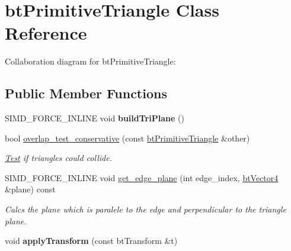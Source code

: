 \hypertarget{classbt_primitive_triangle}{\section{bt\+Primitive\+Triangle Class Reference}
\label{classbt_primitive_triangle}
}


Collaboration diagram for bt\+Primitive\+Triangle\+:
\subsection*{Public Member Functions}
\begin{DoxyCompactItemize}
\item 
\hypertarget{classbt_primitive_triangle_af744acb5a8197dd9154b9707fef252cc}{S\+I\+M\+D\+\_\+\+F\+O\+R\+C\+E\+\_\+\+I\+N\+L\+I\+N\+E void {\bfseries build\+Tri\+Plane} ()}\label{classbt_primitive_triangle_af744acb5a8197dd9154b9707fef252cc}

\item 
bool \hyperlink{classbt_primitive_triangle_a844b5c15a34e656e64135f43a8d27d53}{overlap\+\_\+test\+\_\+conservative} (const \hyperlink{classbt_primitive_triangle}{bt\+Primitive\+Triangle} \&other)
\begin{DoxyCompactList}\small\item\em \hyperlink{class_test}{Test} if triangles could collide. \end{DoxyCompactList}\item 
S\+I\+M\+D\+\_\+\+F\+O\+R\+C\+E\+\_\+\+I\+N\+L\+I\+N\+E void \hyperlink{classbt_primitive_triangle_a88f93beaca616105c4d73bdd337167e1}{get\+\_\+edge\+\_\+plane} (int edge\+\_\+index, \hyperlink{classbt_vector4}{bt\+Vector4} \&plane) const 
\begin{DoxyCompactList}\small\item\em Calcs the plane which is paralele to the edge and perpendicular to the triangle plane. \end{DoxyCompactList}\item 
\hypertarget{classbt_primitive_triangle_ab896f319c6d779b5028090df42432cf9}{void {\bfseries apply\+Transform} (const bt\+Transform \&t)}\label{classbt_primitive_triangle_ab896f319c6d779b5028090df42432cf9}


\end{DoxyCompactItemize}
